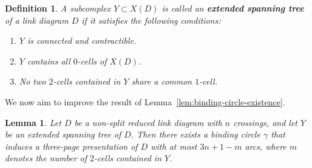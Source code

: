 \documentclass[11pt,a4paper]{amsart}
\newtheorem{lemma}[theorem]{Lemma}
\newtheorem{definition}{Definition}
\begin{document}
\begin{definition}
A subcomplex $Y \subset X(D)$ is called an \textbf{extended spanning tree} of a link diagram $D$ if it satisfies the following conditions:
\begin{enumerate}
\item $Y$ is connected and contractible.
\item $Y$ contains all $0$-cells of $X(D)$.
\item No two $2$-cells contained in $Y$ share a common $1$-cell.
\end{enumerate}
\end{definition}

We now aim to improve the result of Lemma~\ref{lem:binding-circle-existence}.

\begin{lemma} \label{lem:extended}
Let $D$ be a non-split reduced link diagram with $n$ crossings, and let $Y$ be an extended spanning tree of $D$.
Then there exists a binding circle $\gamma$ that induces a three-page presentation of $D$ with at most $3n+1-m$ arcs,
where $m$ denotes the number of $2$-cells contained in $Y$.
\end{lemma}
\end{document}

